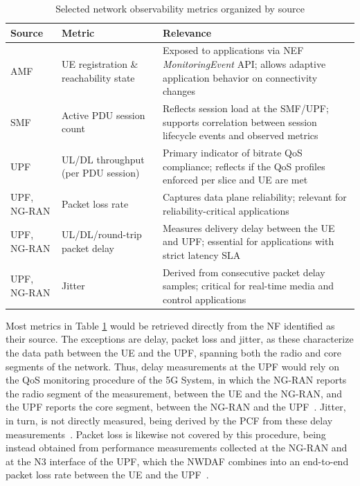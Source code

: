 \begin{table}[htbp]
    \centering
    \renewcommand\tabularxcolumn[1]{m{#1}}
    \begin{tabularx}{\textwidth}{|
        >{\RaggedRight\arraybackslash}m{}|
        >{\RaggedRight\arraybackslash}m{}|
        >{\RaggedRight\arraybackslash}X|}
        \hline
        \textbf{Source} & \textbf{Metric} & \textbf{Relevance} \\
        \hline
        \acs{AMF} & \acs{UE} registration \& reachability state & Exposed to applications via \acs{NEF} \textit{MonitoringEvent} \acs{API}; allows adaptive application behavior on connectivity changes \\
        \hline
        \acs{SMF} & Active \acs{PDU} session count & Reflects session load at the \acs{SMF}/\acs{UPF}; supports correlation between session lifecycle events and observed metrics \\
        \hline
        \acs{UPF} & \acs{UL}/\acs{DL} throughput (per \acs{PDU} session) & Primary indicator of bitrate \acs{QoS} compliance; reflects if the \acs{QoS} profiles enforced per slice and \acs{UE} are met \\
        \hline
        \acs{UPF}, \acs{NG-RAN} & Packet loss rate & Captures data plane reliability; \newline relevant for reliability-critical applications \\
        \hline
        \acs{UPF}, \acs{NG-RAN} & \acs{UL}/\acs{DL}/round-trip packet delay & Measures delivery delay between the \acs{UE} and \acs{UPF}; essential for applications with strict latency \acs{SLA} \\
        \hline
        \acs{UPF}, \acs{NG-RAN} & Jitter & Derived from consecutive packet delay samples; critical for real-time media and control applications \\
        \hline
    \end{tabularx}
    \caption{Selected network observability metrics organized by source}
    \label{tab:proposal:observability:metrics}
\end{table}

Most metrics in Table \ref{tab:proposal:observability:metrics} would be retrieved directly from the \acs{NF} identified as their source. The exceptions are delay, packet loss and jitter, as these characterize the data path between the \acs{UE} and the \acs{UPF}, spanning both the radio and core segments of the network. Thus, delay measurements at the \acs{UPF} would rely on the \acs{QoS} monitoring procedure of the \acs{5G} System, in which the \acs{NG-RAN} reports the radio segment of the measurement, between the \acs{UE} and the \acs{NG-RAN}, and the \acs{UPF} reports the core segment, between the \acs{NG-RAN} and the \acs{UPF}~\cite{ETSI_TS_123_501_V16_9_0}. Jitter, in turn, is not directly measured, being derived by the \acs{PCF} from these delay measurements~\cite{ETSI_TS_123_501_V16_9_0}. Packet loss is likewise not covered by this procedure, being instead obtained from performance measurements collected at the \acs{NG-RAN} and at the N3 interface of the \acs{UPF}, which the \acs{NWDAF} combines into an end-to-end packet loss rate between the \acs{UE} and the \acs{UPF}~\cite{ETSI_TS_123_288_V18_11_0}.

